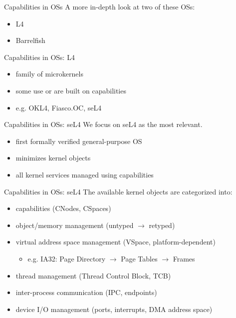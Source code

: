 \documentclass[11pt]{beamer}
\begin{document}
\begin{frame}{Capabilities in OSs}
  \vfill
  A more in-depth look at two of these OSs:
  	\begin{itemize}
          \vfill
	\item L4
	\item Barrelfish
          \vfill
	\end{itemize}
\end{frame}

\begin{frame}{Capabilities in OSs: L4}

  	\begin{itemize}
          \vfill
	\item family of microkernels
          \vfill
	\item some use or are built on capabilities
          \vfill
        \item e.g. OKL4, Fiasco.OC, seL4
          \vfill
	\end{itemize}
\end{frame}

\begin{frame}{Capabilities in OSs: seL4}
  \vfill
  We focus on seL4 as the most relevant.
  \begin{itemize}
    \vfill
  \item first formally verified general-purpose OS
    \vfill
  \item minimizes kernel objects
    \vfill
  \item all kernel services managed using capabilities
    \vfill
  \end{itemize}
\end{frame}

\begin{frame}{Capabilities in OSs: seL4}
  The available kernel objects are categorized into:
  \begin{itemize}
    \vfill
  \item capabilities (CNodes, CSpaces)
    \vfill
  \item object/memory management (untyped $\rightarrow$ retyped)
    \vfill
  \item virtual address space management (VSpace, platform-dependent)
    \begin{itemize}
    \item e.g. IA32: Page Directory $\rightarrow$ Page Tables $\rightarrow$ Frames
    \end{itemize}
    \vfill
  \item thread management (Thread Control Block, TCB)
    \vfill
  \item inter-process communication (IPC, endpoints)
    \vfill
  \item device I/O management (ports, interrupts, DMA address space)
    \vfill
  \end{itemize}
\end{frame}
\end{document}
